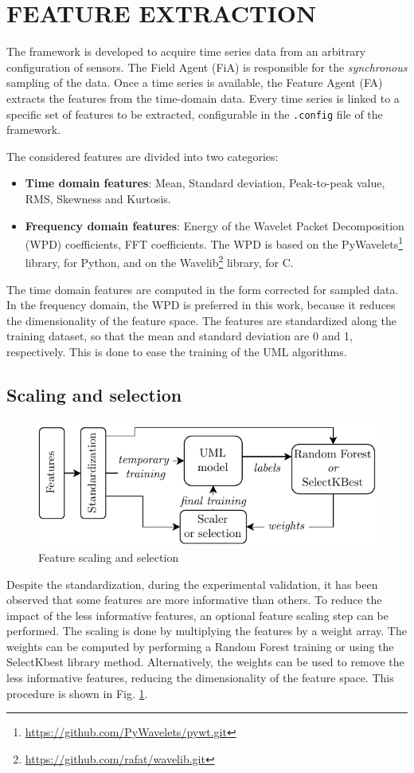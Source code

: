\section{FEATURE EXTRACTION}
The framework is developed to acquire time series data from an arbitrary configuration of sensors. The Field Agent (FiA) is responsible for the \emph{synchronous} sampling of the data. Once a time series is available, the Feature Agent (FA) extracts the features from the time-domain data. Every time series is linked to a specific set of features to be extracted, configurable in the \texttt{.config} file of the framework.

The considered features are divided into two categories:
\begin{itemize}
    \item \textbf{Time domain features}: Mean, Standard deviation, Peak-to-peak value, RMS, Skewness and Kurtosis.
    \item \textbf{Frequency domain features}: Energy of the Wavelet Packet Decomposition (WPD) coefficients, FFT coefficients. The WPD is based on the PyWavelets\footnote{\url{https://github.com/PyWavelets/pywt.git}} library, for Python, and on the Wavelib\footnote{\url{https://github.com/rafat/wavelib.git}} library, for C.
\end{itemize}

The time domain features are computed in the form corrected for sampled data. In the frequency domain, the WPD is preferred in this work, because it reduces the dimensionality of the feature space. The features are standardized along the training dataset, so that the mean and standard deviation are 0 and 1, respectively. This is done to ease the training of the UML algorithms.

\subsection{Scaling and selection}
\begin{figure}
    \includegraphics[width=\linewidth]{images/Feat_scaling.pdf}
    \caption{Feature scaling and selection}
    \label{fig:feature_scaling}
\end{figure}
Despite the standardization, during the experimental validation, it has been observed that some features are more informative than others. To reduce the impact of the less informative features, an optional feature scaling step can be performed. The scaling is done by multiplying the features by a weight array. The weights can be computed by performing a Random Forest training or using the SelectKbest library method. Alternatively, the weights can be used to remove the less informative features, reducing the dimensionality of the feature space. This procedure is shown in Fig. \ref{fig:feature_scaling}.